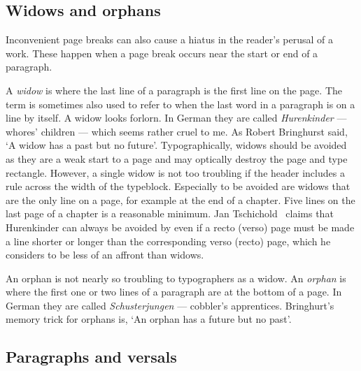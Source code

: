 \documentclass[10pt,a4paper,oneside,extrafontsizes]{memoir}%
\begin{document}





\subsection{Widows and orphans}

\begin{paracol}{2}
\switchEng
    Inconvenient page breaks can also cause a hiatus in the reader's perusal
of a work. These happen when a page break occurs near the start or end of
a paragraph. 

    A \emph{widow} is where the last line of a 
paragraph is the first line on the page. The term is 
sometimes also used to refer to when the last word in a 
paragraph is on a line by itself. A widow looks forlorn.
In German they are called \textit{Hurenkinder} --- 
whores' children --- which seems rather cruel to me.
As Robert Bringhurst said, `A widow has a past but no future'. 
Typographically, widows should be avoided as they are a weak start to a page 
and may optically destroy the page and type rectangle. However, a single widow
is not too troubling if the header includes a rule across the width of the 
typeblock. Especially to be 
avoided are widows that are the only line on a page, for example at the end 
of a chapter. Five lines on the last page of a 
chapter is a reasonable minimum. 
Jan Tschichold~\autocite{TSCHICHOLD91} claims that Hurenkinder can always 
be avoided by even if a recto (verso) page must be made a line shorter or
longer than the corresponding verso (recto) page, which he considers to be 
less of an affront than widows.

    An orphan is not nearly so troubling to typographers as a 
widow. An \emph{orphan} is where the first one or two lines of a 
paragraph are at the bottom of a page. In German they are 
called \textit{Schusterjungen} --- cobbler's apprentices.
Bringhurt's memory trick for orphans is, `An orphan has a future but no 
past'. 
\end{paracol}

\subsection{Paragraphs and versals} \label{sec:versal}
\end{document}
